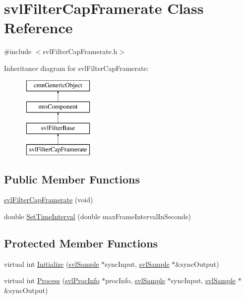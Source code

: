 \hypertarget{classsvl_filter_cap_framerate}{}\section{svl\+Filter\+Cap\+Framerate Class Reference}
\label{classsvl_filter_cap_framerate}


{\ttfamily \#include $<$svl\+Filter\+Cap\+Framerate.\+h$>$}

Inheritance diagram for svl\+Filter\+Cap\+Framerate\+:\begin{figure}[H]
\begin{center}
\leavevmode
\includegraphics[height=4.000000cm]{db/d96/classsvl_filter_cap_framerate}
\end{center}
\end{figure}
\subsection*{Public Member Functions}
\begin{DoxyCompactItemize}
\item 
\hyperlink{classsvl_filter_cap_framerate_a87179f77b77ce423103d5fb72270f975}{svl\+Filter\+Cap\+Framerate} (void)
\item 
double \hyperlink{classsvl_filter_cap_framerate_a4a30219e73e404fe8d8926d129f44bd2}{Set\+Time\+Interval} (double max\+Frame\+Interval\+In\+Seconds)
\end{DoxyCompactItemize}
\subsection*{Protected Member Functions}
\begin{DoxyCompactItemize}
\item 
virtual int \hyperlink{classsvl_filter_cap_framerate_ac226b76bcaaac4a368c09ed3989bb0db}{Initialize} (\hyperlink{classsvl_sample}{svl\+Sample} $\ast$sync\+Input, \hyperlink{classsvl_sample}{svl\+Sample} $\ast$\&sync\+Output)
\item 
virtual int \hyperlink{classsvl_filter_cap_framerate_a1cefa7adcea2dc1ccc2eefe7be2e83cc}{Process} (\hyperlink{structsvl_proc_info}{svl\+Proc\+Info} $\ast$proc\+Info, \hyperlink{classsvl_sample}{svl\+Sample} $\ast$sync\+Input, \hyperlink{classsvl_sample}{svl\+Sample} $\ast$\&sync\+Output)
\end{DoxyCompactItemize}
